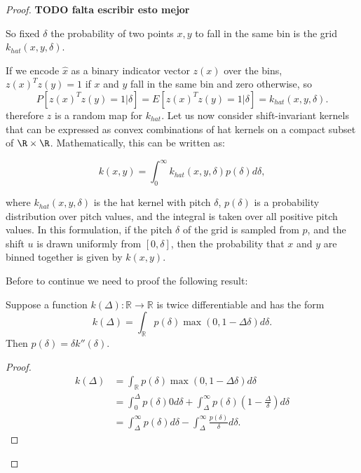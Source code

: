 \begin{proof}
\textbf{TODO falta escribir esto mejor} 

So fixed $\delta$ the probability of two points $x,y$  to fall in the same bin is the grid $k_{hat}(x,y,\delta)$. 

If we encode $\hat{x}$ as a binary indicator vector $z(x)$ over the bins, 
$z(x)^T z(y) = 1$ if $x$ and $y$ fall in the same bin and zero otherwise, so 
\begin{equation}
    P\left[
        z(x)^T z(y) = 1 | \delta
    \right]
    = 
    E\left[
        z(x)^T z(y) = 1 | \delta
    \right]
    = 
    k_{hat}(x,y,\delta). 
\end{equation}
therefore $z$ is a random map for $k_{hat}$. 
Let us now consider shift-invariant kernels that can be expressed as convex combinations of hat kernels on a compact subset of $\R \times \R$. Mathematically, this can be written as:

\begin{equation}
k(x,y) = \int_{0}^\infty k_{hat}(x,y,\delta) p(\delta) d\delta,
\end{equation}

where $k_{hat}(x,y,\delta)$ is the hat kernel with pitch $\delta$, $p(\delta)$ is a probability distribution over pitch values, and the integral is taken over all positive pitch values. In this formulation, if the pitch $\delta$ of the grid is sampled from $p$, and the shift $u$ is drawn uniformly from $[0,\delta]$, then the probability that $x$ and $y$ are binned together is given by $k(x,y)$.

Before to continue we need to proof the following result: 
\begin{lemma}
    \label{eq:lema1}
    Suppose a function $k(\Delta): \mathbb{R} \rightarrow \mathbb{R}$ is twice differentiable and has the form
    \begin{equation}
        k(\Delta) = \int_{\mathbb{R}} p(\delta) \max(0, 1-\Delta \delta) d\delta.
    \end{equation}
    Then $p(\delta) = \delta k''(\delta)$.
\end{lemma}
\begin{proof}
    \begin{align}
        k(\Delta) &= 
        \int_{\mathbb{R}} p(\delta) \max(0, 1-\Delta \delta) d\delta
        \\ 
        & = 
        \int_{0}^\Delta p(\delta) 0 d\delta
        + 
        \int_{\Delta}^\infty
            p(\delta)
            \left(1 - \frac{\Delta}{\delta}\right) 
            d \delta
        \\
        &=
        \int_{\Delta}^\infty
            p(\delta)
            d \delta
        -
        \int_{\Delta}^\infty
            \frac{p(\delta)}{\delta}
            d \delta. 
    \end{align}


\end{proof}
\end{proof}
